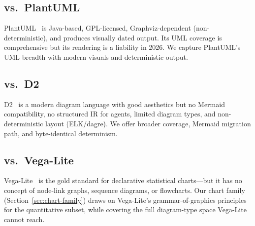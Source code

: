 \subsection{vs.\ PlantUML}

PlantUML~\cite{plantuml} is Java-based, GPL-licensed, Graphviz-dependent (non-deterministic),
and produces visually dated output. Its UML coverage is comprehensive but its rendering is a
liability in 2026. We capture PlantUML's UML breadth with modern visuals and deterministic output.

\subsection{vs.\ D2}

D2~\cite{d2lang} is a modern diagram language with good aesthetics but no Mermaid compatibility,
no structured IR for agents, limited diagram types, and non-deterministic layout (ELK/dagre).
We offer broader coverage, Mermaid migration path, and byte-identical determinism.

\subsection{vs.\ Vega-Lite}

Vega-Lite~\cite{vegalite2017} is the gold standard for declarative statistical charts---but
it has no concept of node-link graphs, sequence diagrams, or flowcharts. Our chart family
(Section~\ref{sec:chart-family}) draws on Vega-Lite's grammar-of-graphics principles for the
quantitative subset, while covering the full diagram-type space Vega-Lite cannot reach.
